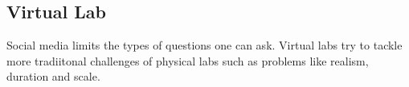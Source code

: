 \subsection{Virtual Lab}
Social media limits the types of questions one can ask.  Virtual labs try to tackle more tradiitonal challenges of physical labs such as problems like realism, duration and scale. 


















